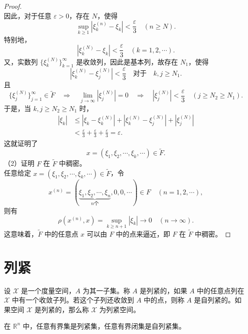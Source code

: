 \documentclass[lang=cn,newtx,10pt,scheme=chinese,thmcnt=chapter]{elegantbook}
\begin{document}
\begin{proof}
\[\]
因此，对于任意 \( \varepsilon > 0 \)，存在 \( N \)，使得
\[
\sup_{k \geqslant 1} \left| \xi_k^{(n)} - \xi_k \right| < \frac{\varepsilon}{3} \quad (n \geqslant N).
\]
特别地，
\[
\left| \xi_k^{(N)} - \xi_k \right| < \frac{\varepsilon}{3} \quad (k = 1, 2, \cdots).
\]
又，实数列 \( \{ \xi_k^{(N)} \}_{k=1}^\infty \) 是收敛列，因此是基本列，故存在 \( N_1 \)，使得
\[
\left| \xi_k^{(N)} - \xi_j^{(N)} \right| < \frac{\varepsilon}{3} \quad \text{对于} \quad k, j \geqslant N_1.
\]
且
\[
\{ \xi_j^{(N)} \}_{j=1}^\infty \in \widetilde{F} \quad \Longrightarrow \quad \lim_{j \to \infty} \left| \xi_j^{(N)} \right| = 0 \quad \Longrightarrow \quad \left| \xi_j^{(N)} \right| < \frac{\varepsilon}{3} \quad (j \geqslant N_2 \geqslant N_1).
\]
于是，当 \( k, j \geqslant N_2 \geqslant N_1 \) 时，
\[
\begin{aligned}
\left| \xi_k \right| & \leqslant \left| \xi_k - \xi_k^{(N)} \right| + \left| \xi_k^{(N)} - \xi_j^{(N)} \right| + \left| \xi_j^{(N)} \right| \\
& < \frac{\varepsilon}{3} + \frac{\varepsilon}{3} + \frac{\varepsilon}{3} = \varepsilon.
\end{aligned}
\]
这就证明了
\[
x = \left( \xi_1, \xi_2, \cdots, \xi_k, \cdots \right) \in \widetilde{F}.
\]
（2）证明 \( F \) 在 \( \widetilde{F} \) 中稠密。\\
任意给定 \( x = \left( \xi_1, \xi_2, \cdots, \xi_k, \cdots \right) \in \widetilde{F} \)，令
\[
x^{(n)} = \left( \underbrace{\xi_1, \xi_2, \cdots, \xi_n}_{n \text{个}}, 0, 0, \cdots \right) \in F \quad (n = 1, 2, \cdots),
\]
则有
\[
\rho\left( x^{(n)}, x \right) = \sup_{k \geqslant n+1} \left| \xi_k \right| \rightarrow 0 \quad (n \rightarrow \infty).
\]
这意味着，\( \widetilde{F} \) 中的任意点 \( x \) 可以由 \( F \) 中的点来逼近，即 \( F \) 在 \( \widetilde{F} \) 中稠密。
\end{proof}

\section{列紧}
\begin{definition}[列紧与自列紧]
设 \( \mathscr{X} \) 是一个度量空间，\( A \) 为其一子集。称 \( A \) 是列紧的，如果 \( A \) 中的任意点列在 \( \mathscr{X} \) 中有一个收敛子列。若这个子列还收敛到 \( A \) 中的点，则称 \( A \) 是自列紧的。如果空间 \( \mathscr{X} \) 是列紧的，那么称 \( \mathscr{X} \) 为列紧空间。
\end{definition}

\begin{proposition}
在 \( \mathbb{R}^n \) 中，任意有界集是列紧集，任意有界闭集是自列紧集。
\end{proposition}
\end{document}
